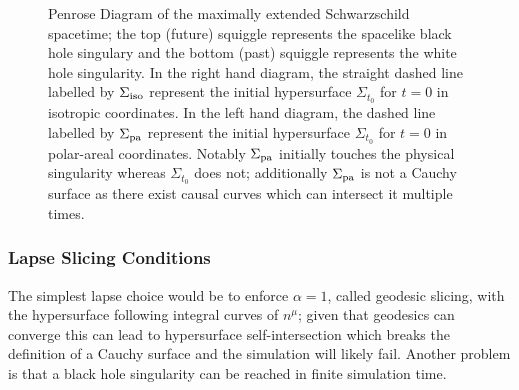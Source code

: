   \begin{figure}[h]
  \caption{Penrose Diagram of the maximally extended Schwarzschild spacetime; the top (future) squiggle represents the spacelike black hole singulary and the bottom (past) squiggle represents the white hole singularity. In the right hand diagram, the straight dashed line labelled by $\Sigma_{\rm iso}$ represent the initial hypersurface $\Sigma_{t_0}$ for $t=0$ in isotropic coordinates. In the left hand diagram, the dashed line labelled by $\Sigma_{\rm pa}$ represent the initial hypersurface $\Sigma_{t_0}$ for $t=0$ in polar-areal coordinates. Notably $\Sigma_{\rm pa}$ initially touches the physical singularity whereas $\Sigma_{t_0}$ does not; additionally $\Sigma_{\rm pa}$ is not a Cauchy surface as there exist causal curves which can intersect it multiple times.}
  \centering
   \hfill
  \label{nr:fig:eddington-finkelstein}\label{nr:fig:isotropic}\label{boson:fig:f1}
\end{figure}

\subsubsection{Lapse Slicing Conditions}

The simplest lapse choice would be to enforce $\alpha=1$, called geodesic slicing, with the hypersurface following integral curves of $n^\mu$; given that geodesics can converge this can lead to hypersurface self-intersection which breaks the definition of a Cauchy surface and the simulation will likely fail. Another problem is that a black hole singularity can be reached in finite simulation time. 


